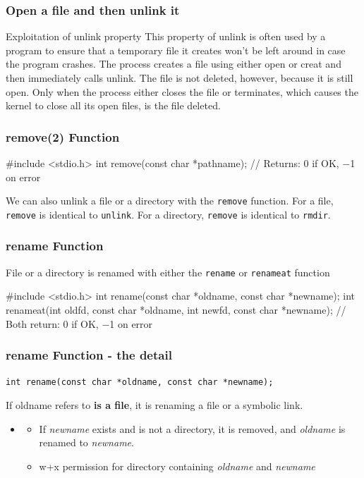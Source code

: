 \documentclass[newPxFont,sthlmFooter,nooffset]{beamer}
\begin{document}
\begin{frame}[t]
  \frametitle{Open a file and then unlink it}
  \begin{block}{Exploitation of unlink property}
  This property of unlink is often used by a program to ensure that a temporary file it creates won’t be left around in case the program crashes. The process creates a file using either open or creat and then immediately calls unlink. The file is not deleted, however, because it is still open. Only when the process either closes the file or terminates, which causes the kernel to close all its open files, is the file deleted.
  \end{block}
\end{frame}



\begin{frame}[containsverbatim,t]
  \frametitle{remove(2) Function}
\begin{codedef}
#include <stdio.h>
int remove(const char *pathname);
// Returns: 0 if OK, −1 on error
\end{codedef}

We can also unlink a file or a directory with the \texttt{remove} function. For a file, \texttt{remove} is identical to \texttt{unlink}. For a directory, \texttt{remove} is identical to \texttt{rmdir}.
\end{frame}

\begin{frame}[containsverbatim,t]
  \frametitle{rename Function}
File or a directory is renamed with either the \texttt{rename} or \texttt{renameat} function

\begin{codedef}
#include <stdio.h>
int rename(const char *oldname, const char *newname);
int renameat(int oldfd, const char *oldname, int newfd, const char *newname);
// Both return: 0 if OK, −1 on error
\end{codedef}

\end{frame}

\begin{frame}[t]
  \frametitle{rename Function - the detail}
\texttt{int rename(const char *oldname, const char *newname);}  
\bigskip

If oldname refers to \textbf{is a file}, it is renaming a file or a symbolic link. 
{\footnotesize
\begin{itemize}
\item 
  \begin{itemize}
  \item If \textit{newname} exists and is not a directory, it is
    removed, and \textit{oldname} is renamed to \textit{newname}.
  \item w+x permission for directory containing \textit{oldname} and \textit{newname}
  \end{itemize}
\end{itemize}
}

\end{frame}
\end{document}
